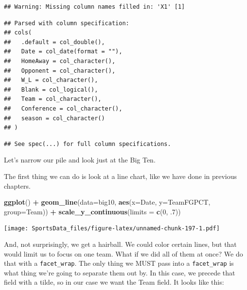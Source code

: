 \documentclass[
]{book}
\newenvironment{Shaded}{\begin{snugshade}}{\end{snugshade}}
\newcommand{\DataTypeTok}[1]{\textcolor[rgb]{0.13,0.29,0.53}{#1}}
\newcommand{\DecValTok}[1]{\textcolor[rgb]{0.00,0.00,0.81}{#1}}
\newcommand{\FloatTok}[1]{\textcolor[rgb]{0.00,0.00,0.81}{#1}}
\newcommand{\KeywordTok}[1]{\textcolor[rgb]{0.13,0.29,0.53}{\textbf{#1}}}
\newcommand{\NormalTok}[1]{#1}
\newcommand{\OperatorTok}[1]{\textcolor[rgb]{0.81,0.36,0.00}{\textbf{#1}}}
\newcommand{\StringTok}[1]{\textcolor[rgb]{0.31,0.60,0.02}{#1}}
\begin{document}
\begin{verbatim}
## Warning: Missing column names filled in: 'X1' [1]
\end{verbatim}

\begin{verbatim}
## Parsed with column specification:
## cols(
##   .default = col_double(),
##   Date = col_date(format = ""),
##   HomeAway = col_character(),
##   Opponent = col_character(),
##   W_L = col_character(),
##   Blank = col_logical(),
##   Team = col_character(),
##   Conference = col_character(),
##   season = col_character()
## )
\end{verbatim}

\begin{verbatim}
## See spec(...) for full column specifications.
\end{verbatim}

Let's narrow our pile and look just at the Big Ten.

\begin{Shaded}
\end{Shaded}

The first thing we can do is look at a line chart, like we have done in previous chapters.

\begin{Shaded}
\begin{Highlighting}[]
\KeywordTok{ggplot}\NormalTok{() }\OperatorTok{+}\StringTok{ }\KeywordTok{geom_line}\NormalTok{(}\DataTypeTok{data=}\NormalTok{big10, }\KeywordTok{aes}\NormalTok{(}\DataTypeTok{x=}\NormalTok{Date, }\DataTypeTok{y=}\NormalTok{TeamFGPCT, }\DataTypeTok{group=}\NormalTok{Team)) }\OperatorTok{+}\StringTok{ }\KeywordTok{scale_y_continuous}\NormalTok{(}\DataTypeTok{limits =} \KeywordTok{c}\NormalTok{(}\DecValTok{0}\NormalTok{, }\FloatTok{.7}\NormalTok{))}
\end{Highlighting}
\end{Shaded}

\texttt{[image: SportsData\_files/figure-latex/unnamed-chunk-197-1.pdf]}

And, not surprisingly, we get a hairball. We could color certain lines, but that would limit us to focus on one team. What if we did all of them at once? We do that with a \texttt{facet\_wrap}. The only thing we MUST pass into a \texttt{facet\_wrap} is what thing we're going to separate them out by. In this case, we precede that field with a tilde, so in our case we want the Team field. It looks like this:
\end{document}
